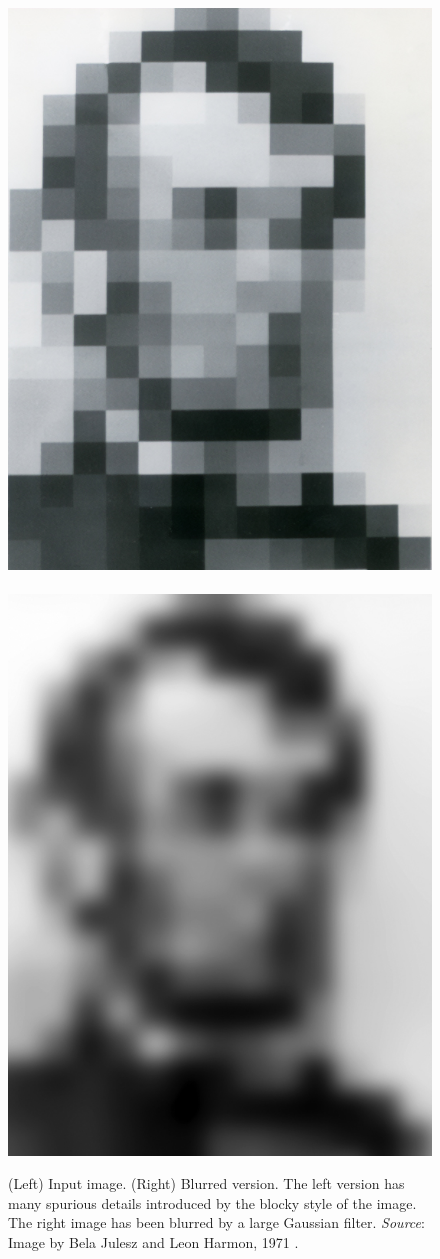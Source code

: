 \begin{figure}[t]
	\centerline{
		\includegraphics[width=.35\linewidth]{figures/blur_filters/Jules_Lincoln_1971.jpg}
		~~
		\includegraphics[width=.35\linewidth]{figures/blur_filters/Jules_Lincoln_1971_blur.jpg}
	}
	\caption{(Left)  Input image.  (Right)  Blurred version.  The left
		version has many spurious details introduced by the blocky style of
		the image.  The right image has been blurred by a large Gaussian
		filter.
			{\em Source}: Image by Bela Julesz and Leon Harmon, 1971 \cite{Harmon_1973}.
	}
	\label{fig:lincoln}
\end{figure}


